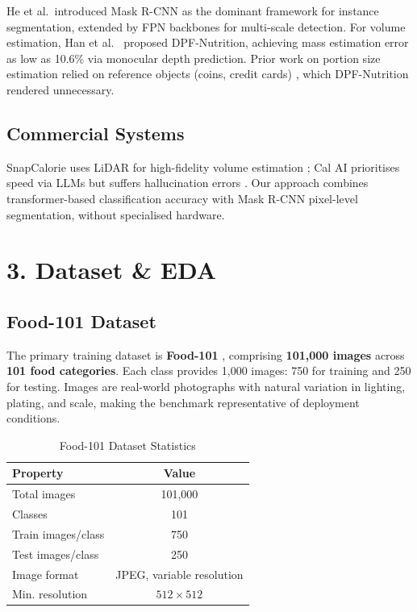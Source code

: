 \documentclass[fleqn,10pt]{SelfArx}
\begin{document}
He et al.\ introduced Mask R-CNN \cite{he2017maskrcnn} as the dominant framework for instance segmentation, extended by FPN backbones for multi-scale detection. For volume estimation, Han et al.\ \cite{han2023dpf} proposed DPF-Nutrition, achieving mass estimation error as low as 10.6\% via monocular depth prediction. Prior work on portion size estimation relied on reference objects (coins, credit cards) \cite{modelbased2013}, which DPF-Nutrition rendered unnecessary.

\subsection{Commercial Systems}

SnapCalorie uses LiDAR for high-fidelity volume estimation \cite{nutritioncoaching2025}; Cal AI prioritises speed via LLMs but suffers hallucination errors \cite{lifehacker2024}. Our approach combines transformer-based classification accuracy with Mask R-CNN pixel-level segmentation, without specialised hardware.

\section{3. Dataset \& EDA}

\subsection{Food-101 Dataset}

The primary training dataset is \textbf{Food-101} \cite{bossard2014food101}, comprising \textbf{101,000 images} across \textbf{101 food categories}. Each class provides 1,000 images: 750 for training and 250 for testing. Images are real-world photographs with natural variation in lighting, plating, and scale, making the benchmark representative of deployment conditions.

\begin{table}[!htb]
\centering
\caption{Food-101 Dataset Statistics}
\label{tab:food101_stats}
\small
\begin{tabular}{@{}lc@{}}
\toprule
\textbf{Property} & \textbf{Value} \\
\midrule
Total images        & 101,000 \\
Classes             & 101 \\
Train images/class  & 750 \\
Test images/class   & 250 \\
Image format        & JPEG, variable resolution \\
Min. resolution     & $512 \times 512$ \\
\bottomrule
\end{tabular}
\end{table}
\end{document}
